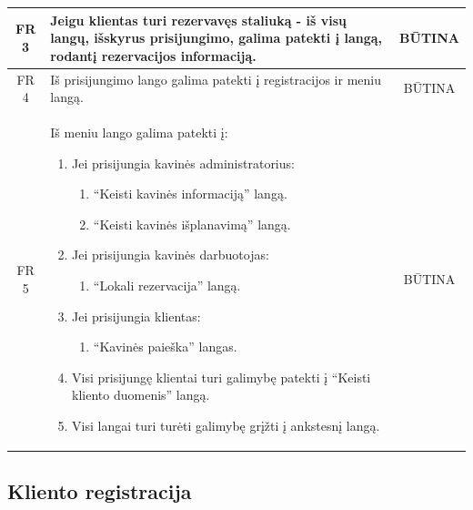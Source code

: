 \documentclass{VUMIFPSkursinis}
\begin{document}
{{{{{\begin{center}
\begin{table}[H]
\begin{tabular}{|p{2cm}|p{}|p{}|}
		\multicolumn{1}{|c|}{FR 3}&
		{Jeigu klientas turi rezervavęs staliuką - iš visų langų, išskyrus \newline prisijungimo, galima patekti į langą, rodantį rezervacijos informaciją.}&
		\multicolumn{1}{|c|}{BŪTINA}\\
	\hline
		\multicolumn{1}{|c|}{FR 4}&
		{Iš prisijungimo lango galima patekti į registracijos ir meniu langą.}&
		\multicolumn{1}{|c|}{BŪTINA}\\
	\hline
		\multicolumn{1}{|c|}{FR 5}&
		{Iš meniu lango galima patekti į:\newline
		\begin{enumerate}
			\item Jei prisijungia kavinės administratorius:
				\begin{enumerate}
					\item “Keisti kavinės informaciją” langą.
					\item “Keisti kavinės išplanavimą” langą.
				\end{enumerate}
			\item Jei prisijungia kavinės darbuotojas:
				\begin{enumerate}
					\item “Lokali rezervacija” langą.
				\end{enumerate}
			\item Jei prisijungia klientas:
				\begin{enumerate}
					\item “Kavinės paieška” langas.
				\end{enumerate}
			\item Visi prisijungę klientai turi galimybę patekti į “Keisti kliento duomenis” langą.
			\item Visi langai turi turėti galimybę grįžti į ankstesnį langą.
		\end{enumerate}
		}&
		\multicolumn{1}{|c|}{BŪTINA}\\		
	\hline
	
	\end{tabular}
	
	\label{table:AplikacijosLangai}
	\end{table}
	
\end{center}

\pagebreak

\subsection{Kliento registracija}
\begin{center}


\end{center}}}}}}
\end{document}
